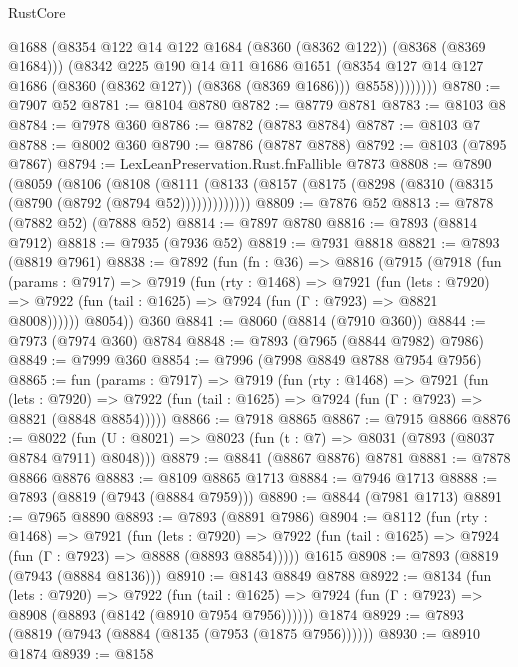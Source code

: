 \begin{lexlean}{RustCore}
\begin{coremodule}
                  @1688
                  (@8354 @122 @14 @122 @1684 (@8360 (@8362 @122)) (@8368 (@8369 @1684)))
                  (@8342
                    @225
                    @190
                    @14
                    @11
                    @1686
                    @1651
                    (@8354 @127 @14 @127 @1686 (@8360 (@8362 @127)) (@8368 (@8369 @1686)))
                    @8558))))))))
@8780 := @7907 @52
@8781 := @8104 @8780
@8782 := @8779 @8781
@8783 := @8103 @8
@8784 := @7978 @360
@8786 := @8782 (@8783 @8784)
@8787 := @8103 @7
@8788 := @8002 @360
@8790 := @8786 (@8787 @8788)
@8792 := @8103 (@7895 @7867)
@8794 := LexLeanPreservation.Rust.fnFallible @7873
@8808 := @7890
    (@8059
      (@8106
        (@8108
          (@8111 (@8133 (@8157 (@8175 (@8298 (@8310 (@8315 (@8790 (@8792 (@8794 @52)))))))))))))
@8809 := @7876 @52
@8813 := @7878 (@7882 @52) (@7888 @52)
@8814 := @7897 @8780
@8816 := @7893 (@8814 @7912)
@8818 := @7935 (@7936 @52)
@8819 := @7931 @8818
@8821 := @7893 (@8819 @7961)
@8838 := @7892
    (fun (fn : @36) =>
    @8816
      (@7915
        (@7918
          (fun (params : @7917) =>
          @7919
            (fun (rty : @1468) =>
            @7921
              (fun (lets : @7920) =>
              @7922 (fun (tail : @1625) => @7924 (fun (Γ : @7923) => @8821 @8008))))))
        @8054))
    @360
@8841 := @8060 (@8814 (@7910 @360))
@8844 := @7973 (@7974 @360) @8784
@8848 := @7893 (@7965 (@8844 @7982) @7986)
@8849 := @7999 @360
@8854 := @7996 (@7998 @8849 @8788 @7954 @7956)
@8865 := fun (params : @7917) =>
  @7919
    (fun (rty : @1468) =>
    @7921
      (fun (lets : @7920) =>
      @7922 (fun (tail : @1625) => @7924 (fun (Γ : @7923) => @8821 (@8848 @8854)))))
@8866 := @7918 @8865
@8867 := @7915 @8866
@8876 := @8022 (fun (U : @8021) => @8023 (fun (t : @7) => @8031 (@7893 (@8037 @8784 @7911) @8048)))
@8879 := @8841 (@8867 @8876) @8781
@8881 := @7878 @8866 @8876
@8883 := @8109 @8865 @1713
@8884 := @7946 @1713
@8888 := @7893 (@8819 (@7943 (@8884 @7959)))
@8890 := @8844 (@7981 @1713)
@8891 := @7965 @8890
@8893 := @7893 (@8891 @7986)
@8904 := @8112
    (fun (rty : @1468) =>
    @7921
      (fun (lets : @7920) =>
      @7922 (fun (tail : @1625) => @7924 (fun (Γ : @7923) => @8888 (@8893 @8854)))))
    @1615
@8908 := @7893 (@8819 (@7943 (@8884 @8136)))
@8910 := @8143 @8849 @8788
@8922 := @8134
    (fun (lets : @7920) =>
    @7922
      (fun (tail : @1625) => @7924 (fun (Γ : @7923) => @8908 (@8893 (@8142 (@8910 @7954 @7956))))))
    @1874
@8929 := @7893 (@8819 (@7943 (@8884 (@8135 (@7953 (@1875 @7956))))))
@8930 := @8910 @1874
@8939 := @8158

\end{coremodule}
\end{lexlean}
